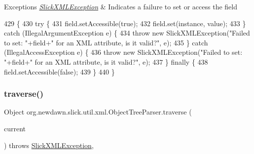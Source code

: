 \begin{DoxyExceptions}{Exceptions}
{\em \mbox{\hyperlink{classorg_1_1newdawn_1_1slick_1_1util_1_1xml_1_1_slick_x_m_l_exception}{Slick\+X\+M\+L\+Exception}}} & Indicates a failure to set or access the field \\
\hline
\end{DoxyExceptions}

\begin{DoxyCode}
429                                                                                                \{
430         \textcolor{keywordflow}{try} \{
431             field.setAccessible(\textcolor{keyword}{true});
432             field.set(instance, value);
433         \} \textcolor{keywordflow}{catch} (IllegalArgumentException e) \{
434             \textcolor{keywordflow}{throw} \textcolor{keyword}{new} SlickXMLException(\textcolor{stringliteral}{"Failed to set: "}+field+\textcolor{stringliteral}{" for an XML attribute, is it valid?"}, e);
435         \} \textcolor{keywordflow}{catch} (IllegalAccessException e) \{
436             \textcolor{keywordflow}{throw} \textcolor{keyword}{new} SlickXMLException(\textcolor{stringliteral}{"Failed to set: "}+field+\textcolor{stringliteral}{" for an XML attribute, is it valid?"}, e);
437         \} \textcolor{keywordflow}{finally} \{
438             field.setAccessible(\textcolor{keyword}{false});
439         \}
440     \}
\end{DoxyCode}
\mbox{\label{classorg_1_1newdawn_1_1slick_1_1util_1_1xml_1_1_object_tree_parser_a1adc20e7ba6879b553d681e59f182126}} 
\subsubsection{\texorpdfstring{traverse()}{traverse()}\hspace{0.1cm}{\footnotesize\ttfamily [1/2]}}
{\footnotesize\ttfamily Object org.\+newdawn.\+slick.\+util.\+xml.\+Object\+Tree\+Parser.\+traverse (\begin{DoxyParamCaption}\item[{\mbox{\hyperlink{classorg_1_1newdawn_1_1slick_1_1util_1_1xml_1_1_x_m_l_element}{X\+M\+L\+Element}}}]{current }\end{DoxyParamCaption}) throws \mbox{\hyperlink{classorg_1_1newdawn_1_1slick_1_1util_1_1xml_1_1_slick_x_m_l_exception}{Slick\+X\+M\+L\+Exception}}\hspace{0.3cm}{\ttfamily [inline]}, {\ttfamily [private]}}

